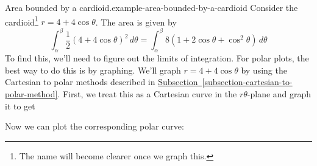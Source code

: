 \documentclass[10pt,]{book}
\numberwithin{equation}{section}
\begin{document}
\begin{example}{Area bounded by a cardioid.}{example-area-bounded-by-a-cardioid}%
\hypertarget{p-1048}{}%
Consider the cardioid\footnote{The name will become clearer once we graph this.\label{fn-1}} \(r = 4+4\cos\theta\). The area is given by%
%
\begin{equation*}
\int_{\alpha}^{\beta}\frac{1}{2}(4+4\cos\theta)^{2}\,d\theta = \int_{\alpha}^{\beta}8(1+2\cos\theta+\cos^{2}\theta)\,d\theta
\end{equation*}
\hypertarget{p-1049}{}%
To find this, we'll need to figure out the limits of integration. For polar plots, the best way to do this is by graphing. We'll graph \(r=4+4\cos\theta\) by using the Cartesian to polar methods described in \hyperref[subsection-cartesian-to-polar-method]{Subsection~\ref{subsection-cartesian-to-polar-method}}. First, we treat this as a Cartesian curve in the \(r\theta\)-plane and graph it to get%
\begin{figure}
\centering
{
}
\end{figure}
\hypertarget{p-1050}{}%
Now we can plot the corresponding polar curve:%
\begin{figure}
\centering
{
}
\end{figure}
\end{example}
\end{document}
